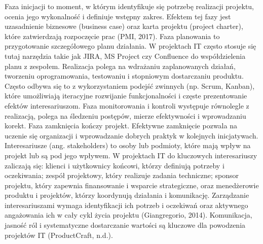 Faza inicjacji to moment, w którym identyfikuje się potrzebę realizacji projektu, ocenia jego wykonalność i definiuje wstępny zakres. Efektem tej fazy jest uzasadnienie biznesowe (business case) oraz karta projektu (project charter), które zatwierdzają rozpoczęcie prac (PMI, 2017). Faza planowania to przygotowanie szczegółowego planu działania. W projektach IT często stosuje się tutaj narzędzia takie jak JIRA, MS Project czy Confluence do współdzielenia planu z zespołem. Realizacja polega na wdrażaniu zaplanowanych działań, tworzeniu oprogramowania, testowaniu i stopniowym dostarczaniu produktu. Często odbywa się to z wykorzystaniem podejść zwinnych (np. Scrum, Kanban), które umożliwiają iteracyjne rozwijanie funkcjonalności i częste prezentowanie efektów interesariuszom. Faza monitorowania i kontroli występuje równolegle z realizacją, polega na śledzeniu postępów, mierze efektywności i wprowadzaniu korekt. Faza zamknięcia kończy projekt. Efektywne zamknięcie pozwala na uczenie się organizacji i wprowadzanie dobrych praktyk w kolejnych inicjatywach.
Interesariusze (ang. stakeholders) to osoby lub podmioty, które mają wpływ na projekt lub są pod jego wpływem. W projektach IT do kluczowych interesariuszy zaliczają się: klienci i użytkownicy końcowi, którzy definiują potrzeby i oczekiwania; zespół projektowy, który realizuje zadania techniczne; sponsor projektu, który zapewnia finansowanie i wsparcie strategiczne, oraz menedżerowie produktu i projektów, którzy koordynują działania i komunikację. Zarządzanie interesariuszami wymaga identyfikacji ich potrzeb i oczekiwań oraz aktywnego angażowania ich w cały cykl życia projektu (Giangregorio, 2014). Komunikacja, jasność ról i systematyczne dostarczanie wartości są kluczowe dla powodzenia projektów IT (ProductCraft, n.d.).
